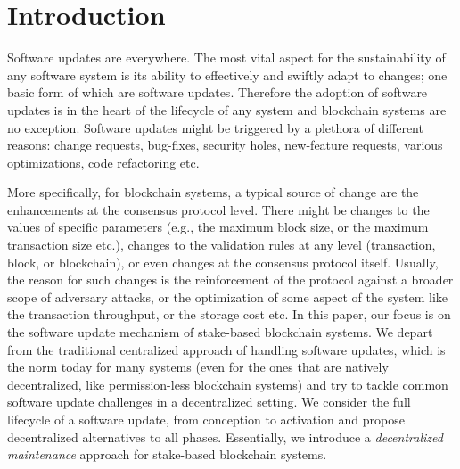 \section{Introduction}
Software updates are everywhere. The most vital aspect for the sustainability of any software system is its ability to effectively and swiftly adapt to changes; one basic form of which are software updates. Therefore the adoption of software updates is in the heart of the lifecycle of any system and blockchain systems are no exception. Software updates might be triggered by a plethora of different reasons: change requests, bug-fixes, security holes, new-feature requests, various optimizations, code refactoring etc.


More specifically, for blockchain systems, a typical source of change are the enhancements at the consensus protocol level. There might be changes to the values of specific parameters (e.g., the maximum block size, or the maximum transaction size etc.), changes to the validation rules at any level (transaction, block, or blockchain), or even changes at the consensus protocol itself. Usually, the reason for such changes is the reinforcement of the protocol against a broader scope of adversary attacks, or the optimization of some aspect of the system like the transaction throughput, or the storage cost etc.
In this paper, our focus is on the software update mechanism of stake-based blockchain systems. We depart from the traditional centralized approach of handling software updates, which is the norm today for many systems (even for the ones that are natively decentralized, like permission-less blockchain systems) and try to tackle common software update challenges in a decentralized setting. We consider the full lifecycle of a software update, from conception to activation and propose decentralized alternatives to all phases. Essentially, we introduce a \emph{decentralized maintenance} approach for stake-based blockchain systems.

